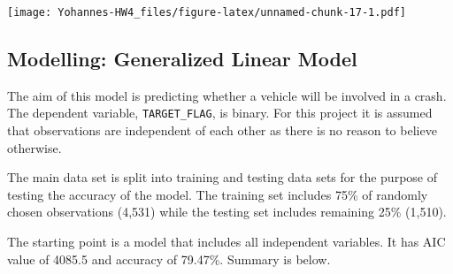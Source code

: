 \documentclass[]{article}
\begin{document}
\texttt{[image: Yohannes-HW4\_files/figure-latex/unnamed-chunk-17-1.pdf]}

\subsection{Modelling: Generalized Linear
Model}\label{modelling-generalized-linear-model}

The aim of this model is predicting whether a vehicle will be involved
in a crash. The dependent variable, \texttt{TARGET\_FLAG}, is binary.
For this project it is assumed that observations are independent of each
other as there is no reason to believe otherwise.

The main data set is split into training and testing data sets for the
purpose of testing the accuracy of the model. The training set includes
75\% of randomly chosen observations (4,531) while the testing set
includes remaining 25\% (1,510).

The starting point is a model that includes all independent variables.
It has AIC value of 4085.5 and accuracy of 79.47\%. Summary is below.
\end{document}
